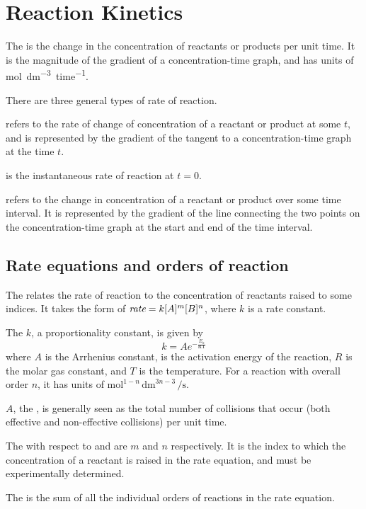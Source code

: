 \documentclass[Chemistry.tex]{subfiles}
\begin{document}
\chapter{Reaction Kinetics}
The  is the change in the concentration of reactants or products per unit time. It is the magnitude of the gradient of a concentration-time graph, and has units of \si{mol.dm^{-3}.time^{-1}}.

There are three general types of rate of reaction.

 refers to the rate of change of concentration of a reactant or product at some \(t\), and is represented by the gradient of the tangent to a concentration-time graph at the time \(t\).

 is the instantaneous rate of reaction at \(t=0\).

 refers to the change in concentration of a reactant or product over some time interval. It is represented by the gradient of the line connecting the two points on the concentration-time graph at the start and end of the time interval.
\section{Rate equations and orders of reaction}
The  relates the rate of reaction to the concentration of reactants raised to some indices. It takes the form of \(\textit{rate} = k[A]^m[B]^n\), where \(k\) is a rate constant.

The  \(k\), a proportionality constant, is given by \[k = Ae^{-\frac{E_{a}}{\text{RT}}}\] where \(A\) is the Arrhenius constant, \slEa{} is the activation energy of the reaction, \(R\) is the molar gas constant, and \(T\) is the temperature. For a reaction with overall order \(n\), it has units of \(\si{\mol}^{1-n}\,\si{\deci\metre}^{3n-3}\,\si{\per\second}\).

\(A\), the , is generally seen as the total number of collisions that occur (both effective and non-effective collisions) per unit time.

The  with respect to  and  are \(m\) and \(n\) respectively. It is the index to which the concentration of a reactant is raised in the rate equation, and must be experimentally determined.

The  is the sum of all the individual orders of reactions in the rate equation.
\end{document}
